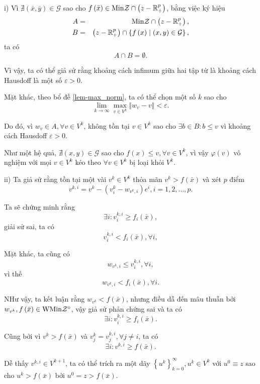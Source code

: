 \begin{cm}
    i) Vì $\nexists(\bar{x},\bar{y})\in \mathcal{G}$ sao cho $f\left(\bar{x}\right)\in{\rm Min}\mathcal{Z}\cap\left(z-\mathbb{R}_{+}^{p}\right)$, bằng việc ký hiệu
\begin{eqnarray*}
A & = & {\rm Min}\mathcal{Z}\cap\left(z-\mathbb{R}_{+}^{p}\right),\\
B & = & \left(z-\mathbb{R}_{+}^{p}\right)\cap\left\{ f\left(x\right)\mid (x,y)\in \mathcal{G}\right\} ,
\end{eqnarray*}
ta có
\[
A\cap B=\emptyset.
\]

Vì vậy, ta có thể giả sử rằng khoảng cách infimum giữa hai tập từ là khoảng cách Hausdoff là một số $\varepsilon>0$.

Mặt khác, theo bổ đề \ref{lem-max_norm}, ta có thể chọn một số
$k$ sao cho
\[
\lim_{k\rightarrow\infty}\max_{v\in V^{k}}\left\Vert w_{v}-v\right\Vert <\varepsilon.
\]

Do đó, vì $w_{v}\in A,\forall v\in V^{k}$, không tồn tại
$v\in V^{k}$ sao cho $\exists b\in B:b\leq v$ vì khoảng cách Hausdoff $\varepsilon>0$.

Như một hệ quả, $\nexists(x,y)\in \mathcal{G}$ sao cho
$f\left(x\right)\leq v,\forall v\in V^{k}$, vì vậy $\varphi\left(v\right)$
vô nghiệm với mọi $v\in V^{k}$ kéo theo $\forall v\in V^{k}$
bị loại khỏi $V^{k}$.

ii) Ta giả sử rằng tồn tại một vài $v^{k}\in V^{k}$ thỏa mãn $v^{k}>f\left(\bar{x}\right)$ và xét $p$ điểm
\[
v^{k,i}=v^{k}-\left(v_{i}^{k}-w_{v^{k},i}\right)e^{i},i=1,2,\dots,p.
\]

Ta sẽ chứng minh rằng
\[
\exists i:v_{i}^{k,i}\geq f_{i}\left(\bar{x}\right),
\]
giải sử sai, ta có
\[
v_{i}^{k,i}<f_{i}\left(\bar{x}\right),\forall i,
\]

Mặt khác, ta cũng có
\[
w_{v^{k},i}\leq v_{i}^{k,i},\forall i,
\]
vì thế
\[
w_{v^{k},i}<f_{i}\left(\bar{x}\right),\forall i.
\]

NHư vậy, ta kết luận rằng $w_{v^{k}}<f\left(\bar{x}\right)$, nhưng điều dẫ đến mâu thuẫn bởi $w_{v^{k}},f\left(\bar{x}\right)\in{\rm WMin}\mathcal{Z}^{\diamond}$, vậy giả sử phản chứng sai và ta có
\[
\exists i:v_{i}^{k,i}\geq f_{i}\left(\bar{x}\right).
\]

Cũng bởi vì $v^{k}>f\left(\bar{x}\right)$ và $v_{j}^{k}=v_{j}^{k,i},\forall j\neq i$,
ta có
\[
\exists i:v^{k,i}\geq f\left(\bar{x}\right).
\]

Dễ thấy $v^{k,i}\in V^{k+1}$, ta có thể trích ra một dãy $\left\{ u^{k}\right\} _{k=0}^{\infty},u^{k}\in V^{k}$ với $u^{0}\equiv z$ sao cho $u^{k}>f\left(\bar{x}\right)$ bởi $u^{0}=z>f\left(\bar{x}\right)$.


\end{cm}
